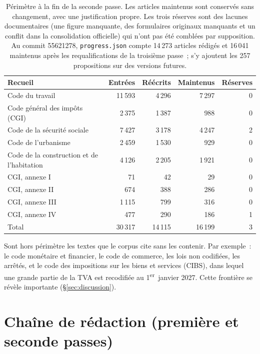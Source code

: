 \documentclass[11pt,a4paper]{article}
\begin{document}
\begin{table}[ht]
\centering
\small
\begin{tabularx}{\linewidth}{lRRRR}
\toprule
Recueil & Entrées & Réécrits & Maintenus & Réserves\\
\midrule
Code du travail & 11\,593 & 4\,296 & 7\,297 & 0\\
Code général des impôts (CGI) & 2\,375 & 1\,387 & 988 & 0\\
Code de la sécurité sociale & 7\,427 & 3\,178 & 4\,247 & 2\\
Code de l'urbanisme & 2\,459 & 1\,530 & 929 & 0\\
Code de la construction et de l'habitation & 4\,126 & 2\,205 & 1\,921 & 0\\
CGI, annexe I & 71 & 42 & 29 & 0\\
CGI, annexe II & 674 & 388 & 286 & 0\\
CGI, annexe III & 1\,115 & 799 & 316 & 0\\
CGI, annexe IV & 477 & 290 & 186 & 1\\
\midrule
Total & 30\,317 & 14\,115 & 16\,199 & 3\\
\bottomrule
\end{tabularx}
\caption{Périmètre à la fin de la seconde passe. Les articles \og maintenus \fg{} sont conservés sans changement, avec une justification propre. Les trois \og réserves \fg{} sont des lacunes documentaires (une figure manquante, des formulaires originaux manquants et un conflit dans la consolidation officielle) qui n'ont pas été comblées par supposition. Au commit 55621278, \texttt{progress.json} compte 14\,273 articles rédigés et 16\,041 maintenus après les requalifications de la troisième passe~; s'y ajoutent les 257 propositions sur des versions futures.}
\label{tab:corpus}
\end{table}

Sont hors périmètre les textes que le corpus cite sans les contenir. Par exemple~: le code monétaire et financier, le code de commerce, les lois non codifiées, les arrêtés, et le code des impositions sur les biens et services (CIBS), dans lequel une grande partie de la TVA est recodifiée au 1\textsuperscript{er}~janvier 2027. Cette frontière se révèle importante (\S\ref{sec:discussion}).

\section{Chaîne de rédaction (première et seconde passes)}
\label{sec:drafting}
\end{document}
